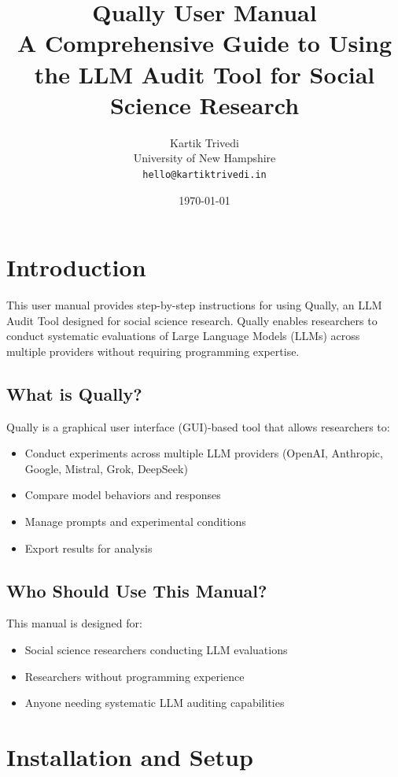 \documentclass[11pt,a4paper]{article}
\title{Qually User Manual\\
\large A Comprehensive Guide to Using the LLM Audit Tool for Social Science Research}
\author{Kartik Trivedi\\
\small University of New Hampshire\\
\small \texttt{hello@kartiktrivedi.in}}
\date{\today}
\begin{document}
\maketitle

\tableofcontents
\newpage

\section{Introduction}
\label{sec:intro}

This user manual provides step-by-step instructions for using Qually, an LLM Audit Tool designed for social science research. Qually enables researchers to conduct systematic evaluations of Large Language Models (LLMs) across multiple providers without requiring programming expertise.

\subsection{What is Qually?}
Qually is a graphical user interface (GUI)-based tool that allows researchers to:
\begin{itemize}
    \item Conduct experiments across multiple LLM providers (OpenAI, Anthropic, Google, Mistral, Grok, DeepSeek)
    \item Compare model behaviors and responses
    \item Manage prompts and experimental conditions
    \item Export results for analysis
\end{itemize}

\subsection{Who Should Use This Manual?}
This manual is designed for:
\begin{itemize}
    \item Social science researchers conducting LLM evaluations
    \item Researchers without programming experience
    \item Anyone needing systematic LLM auditing capabilities
\end{itemize}

\section{Installation and Setup}
\label{sec:installation}
\end{document}
